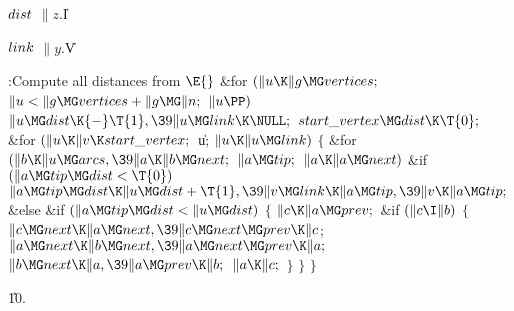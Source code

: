 \Y\B\4\D$\\{dist}$ \5
$\|z.{}$\|I\par
\B\4\D$\\{link}$ \5
$\|y.{}$\|V\par
\Y\B\4:Compute all distances from \X${}\E{}$\6
\&{for} ${}(\|u\K\|g\MG\\{vertices};{}$ ${}\|u<\|g\MG\\{vertices}+\|g\MG\|n;{}$
${}\|u\PP){}$\1\5
${}\|u\MG\\{dist}\K{-}\T{1},\39\|u\MG\\{link}\K\NULL;{}$\2\6
${}\\{start\_vertex}\MG\\{dist}\K\T{0};{}$\6
\&{for} ${}(\|u\K\|v\K\\{start\_vertex};{}$ \|u; ${}\|u\K\|u\MG\\{link}){}$\5
${}\{{}$\1\6
\&{for} ${}(\|b\K\|u\MG\\{arcs},\39\|a\K\|b\MG\\{next};{}$ ${}\|a\MG\\{tip};{}$
${}\|a\K\|a\MG\\{next}){}$\1\6
\&{if} ${}(\|a\MG\\{tip}\MG\\{dist}<\T{0}){}$\1\5
${}\|a\MG\\{tip}\MG\\{dist}\K\|u\MG\\{dist}+\T{1},\39\|v\MG\\{link}\K\|a\MG%
\\{tip},\39\|v\K\|a\MG\\{tip};{}$\2\6
\&{else} \&{if} ${}(\|a\MG\\{tip}\MG\\{dist}<\|u\MG\\{dist}){}$\5
${}\{{}$\1\6
${}\|c\K\|a\MG\\{prev};{}$\6
\&{if} ${}(\|c\I\|b){}$\5
${}\{{}$\1\6
${}\|c\MG\\{next}\K\|a\MG\\{next},\39\|c\MG\\{next}\MG\\{prev}\K\|c{}$;\6
${}\|a\MG\\{next}\K\|b\MG\\{next},\39\|a\MG\\{next}\MG\\{prev}\K\|a;{}$\6
${}\|b\MG\\{next}\K\|a,\39\|a\MG\\{prev}\K\|b;{}$\6
${}\|a\K\|c;{}$\6
\4${}\}{}$\2\6
\4${}\}{}$\2\2\6
\4${}\}{}$\2\par
\U10.\fi


